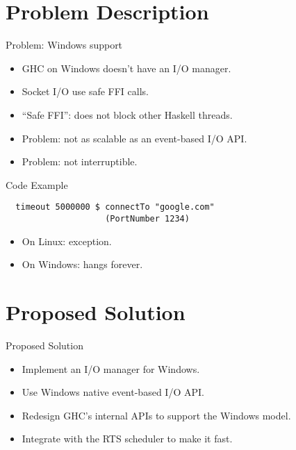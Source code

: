 \documentclass{beamer}
\begin{document}
\section {Problem Description}


\begin{frame}{Problem: Windows support}
  \begin{itemize}
  \item GHC on Windows doesn't have an I/O manager.
  \item Socket I/O use safe FFI calls.
  \item ``Safe FFI'': does not block other Haskell threads.
  \item Problem: not as scalable as an event-based I/O API.
  \item Problem: not interruptible.
  \end{itemize}
\end{frame}

\begin{frame}[fragile]{Code Example}
\begin{verbatim}
  timeout 5000000 $ connectTo "google.com"
                    (PortNumber 1234)
\end{verbatim}
  \begin{itemize}
  \item On Linux: exception.
  \item On Windows: hangs forever.
  \end{itemize}
\end{frame}

\section {Proposed Solution}


\begin{frame}{Proposed Solution}
  \begin{itemize}
  \item Implement an I/O manager for Windows.
  \item Use Windows native event-based I/O API.
  \item Redesign GHC's internal APIs to support the Windows model.
  \item Integrate with the RTS scheduler to make it fast.
  \end{itemize}
\end{frame}
\end{document}
